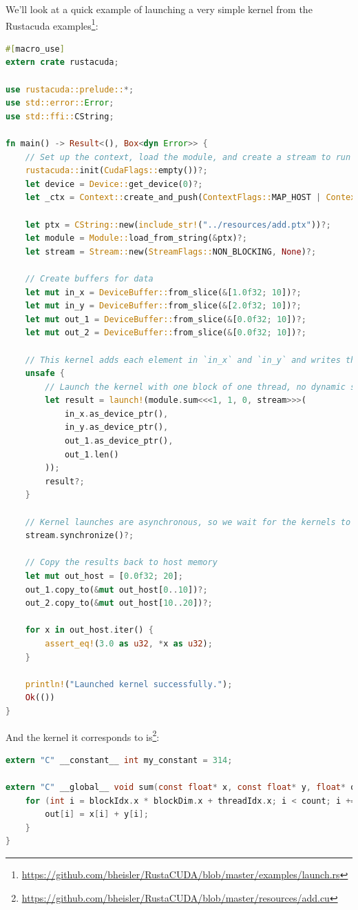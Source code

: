 \documentclass[a4paper]{report}
\begin{document}
We'll look at a quick example of launching a very simple kernel from the Rustacuda examples\footnote{\url{https://github.com/bheisler/RustaCUDA/blob/master/examples/launch.rs}}: 
\begin{lstlisting}[language=Rust]
#[macro_use]
extern crate rustacuda;

use rustacuda::prelude::*;
use std::error::Error;
use std::ffi::CString;

fn main() -> Result<(), Box<dyn Error>> {
    // Set up the context, load the module, and create a stream to run kernels in.
    rustacuda::init(CudaFlags::empty())?;
    let device = Device::get_device(0)?;
    let _ctx = Context::create_and_push(ContextFlags::MAP_HOST | ContextFlags::SCHED_AUTO, device)?;

    let ptx = CString::new(include_str!("../resources/add.ptx"))?;
    let module = Module::load_from_string(&ptx)?;
    let stream = Stream::new(StreamFlags::NON_BLOCKING, None)?;

    // Create buffers for data
    let mut in_x = DeviceBuffer::from_slice(&[1.0f32; 10])?;
    let mut in_y = DeviceBuffer::from_slice(&[2.0f32; 10])?;
    let mut out_1 = DeviceBuffer::from_slice(&[0.0f32; 10])?;
    let mut out_2 = DeviceBuffer::from_slice(&[0.0f32; 10])?;

    // This kernel adds each element in `in_x` and `in_y` and writes the result into `out`.
    unsafe {
        // Launch the kernel with one block of one thread, no dynamic shared memory on `stream`.
        let result = launch!(module.sum<<<1, 1, 0, stream>>>(
            in_x.as_device_ptr(),
            in_y.as_device_ptr(),
            out_1.as_device_ptr(),
            out_1.len()
        ));
        result?;
    }

    // Kernel launches are asynchronous, so we wait for the kernels to finish executing.
    stream.synchronize()?;

    // Copy the results back to host memory
    let mut out_host = [0.0f32; 20];
    out_1.copy_to(&mut out_host[0..10])?;
    out_2.copy_to(&mut out_host[10..20])?;

    for x in out_host.iter() {
        assert_eq!(3.0 as u32, *x as u32);
    }

    println!("Launched kernel successfully.");
    Ok(())
}
\end{lstlisting}

And the kernel it corresponds to is\footnote{\url{https://github.com/bheisler/RustaCUDA/blob/master/resources/add.cu}}:
\begin{lstlisting}[language=C]
extern "C" __constant__ int my_constant = 314;

extern "C" __global__ void sum(const float* x, const float* y, float* out, int count) {
    for (int i = blockIdx.x * blockDim.x + threadIdx.x; i < count; i += blockDim.x * gridDim.x) {
        out[i] = x[i] + y[i];
    }
}
\end{lstlisting}
\end{document}
